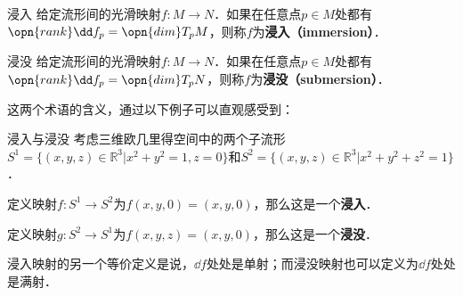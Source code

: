 \begin{definition}{浸入}
给定流形间的光滑映射$f:M\to N$．如果在任意点$p\in M$处都有$\opn{rank}\dd f_p=\opn{dim}T_pM$，则称$f$为\textbf{浸入（immersion）}．
\end{definition}

\begin{definition}{浸没}
给定流形间的光滑映射$f:M\to N$．如果在任意点$p\in M$处都有$\opn{rank}\dd f_p=\opn{dim}T_pN$，则称$f$为\textbf{浸没（submersion）}．
\end{definition}

这两个术语的含义，通过以下例子可以直观感受到：

\begin{example}{浸入与浸没}
考虑三维欧几里得空间中的两个子流形$S^1=\{(x, y, z)\in\mathbb{R}^3|x^2+y^2=1, z=0\}$和$S^2=\{(x, y, z)\in\mathbb{R}^3|x^2+y^2+z^2=1\}$．

定义映射$f:S^1\to S^2$为$f(x, y, 0)=(x, y, 0)$，那么这是一个\textbf{浸入}．

定义映射$g:S^2\to S^1$为$f(x, y, z)=(x, y, 0)$，那么这是一个\textbf{浸没}．
\end{example}

浸入映射的另一个等价定义是说，$\dd f$处处是单射；而浸没映射也可以定义为$\dd f$处处是满射．















